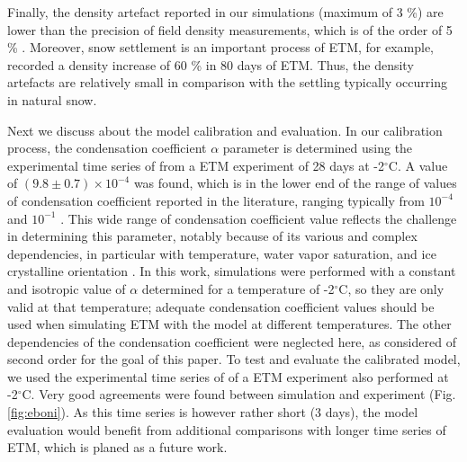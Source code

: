 \documentclass[draft,ms]{agujournal2019}
\begin{document}
Finally, the density artefact reported in our simulations (maximum of 3 \%)  are lower than the precision of field density measurements, which is of the order of 5 \% \cite{proksch2016intercomparison}. Moreover, snow settlement is an important process of ETM, for example,  recorded a density increase of 60 \% in 80 days of ETM. Thus, the density artefacts are relatively small in comparison with the settling typically occurring in natural snow.


Next we discuss about the model calibration and evaluation.
In our calibration process, the condensation coefficient $\alpha$ parameter is determined using the experimental time series of  from a ETM experiment of 28 days at -2$^\circ$C. A value of $(9.8 \pm 0.7)\times 10^{-4}$ was found, which is in the lower end of the range of values of condensation coefficient reported in the literature, ranging typically from  $10^{-4}$ and $10^{-1}$ \cite{libbrecht2019snow}. This wide range of condensation coefficient value reflects the challenge in determining this parameter, notably because of its various and complex dependencies, in particular with temperature, water vapor saturation, and ice crystalline orientation \cite{libbrecht2019snow}.
In this work, simulations were performed with a constant and isotropic value of $\alpha$ determined for a temperature of -2$^\circ$C, so they are only valid at that temperature; adequate condensation coefficient values should be used when simulating ETM with the model at different temperatures. The other dependencies of the condensation coefficient were neglected here, as considered of second order for the goal of this paper.
To test and evaluate the calibrated model, we used the experimental time series of  of a ETM experiment also performed at -2$^\circ$C. Very good agreements were found between simulation and experiment (Fig. \ref{fig:eboni}). As this time series is however rather short (3 days), the model evaluation would benefit from additional comparisons with longer time series of ETM, which is planed as a future work.
\end{document}
